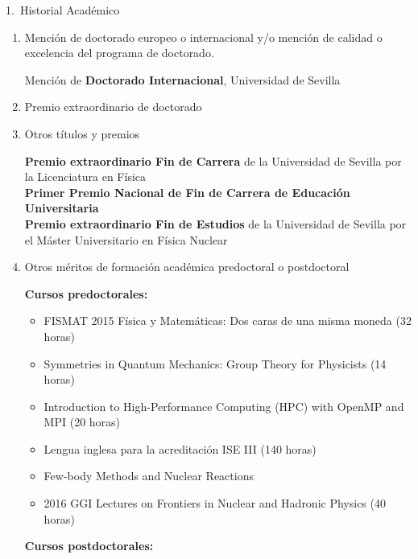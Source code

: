 \documentclass{resume2} %
\begin{document}
\begin{rSection}{1.~Historial Acad\'emico}
\begin{enumerate}[label=\alph*.]
{\bf Universidad de Sevilla}\hfill{29/10/2018}\\
{\em A Transfer to the Continuum formalism for the study of $(p, pn)$ and $(p, 2p)$ reactions on unstable nuclei} \\
Calificaci\'on: Cum Laude 10/10\\


\item Menci\'on de doctorado europeo o internacional y/o menci\'on de calidad o excelencia del programa de doctorado.

Mención de \textbf{Doctorado Internacional}, Universidad de Sevilla

\item Premio extraordinario de doctorado

\item Otros t\'itulos y premios

\textbf{Premio extraordinario Fin de Carrera} de la Universidad de Sevilla por la Licenciatura en F\'isica\\

\textbf{Primer Premio Nacional de Fin de Carrera de Educaci\'on Universitaria} \\

\textbf{Premio extraordinario Fin de Estudios} de la Universidad de Sevilla por el M\'aster Universitario en F\'isica Nuclear 

\item Otros méritos de formación acad\'emica predoctoral o postdoctoral

{\sc \bf Cursos predoctorales:}
\begin{itemize}
\item FISMAT 2015 F\'isica y Matem\'aticas: Dos caras de una misma moneda (32 horas)
\item Symmetries in Quantum Mechanics: Group Theory for Physicists (14 horas)
\item Introduction to High-Performance Computing (HPC) with OpenMP and MPI
(20 horas)
\item Lengua inglesa para la acreditación ISE III (140 horas)
\item Few-body Methods and Nuclear Reactions
\item 2016 GGI Lectures on Frontiers in Nuclear and Hadronic Physics (40 horas)

\end{itemize}

{\sc \bf Cursos postdoctorales:}

\end{enumerate}

\end{rSection}
\end{document}
